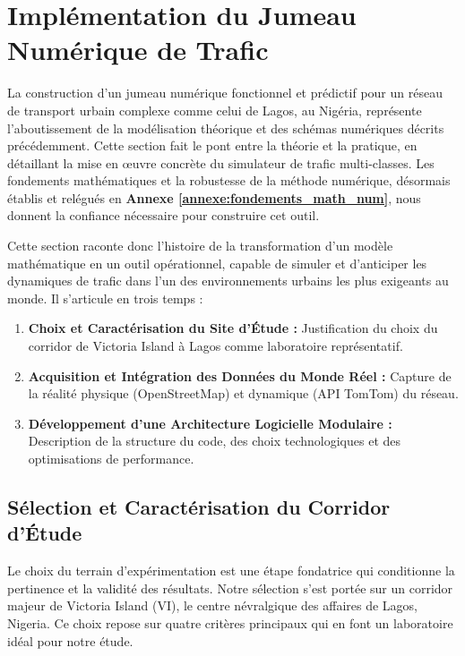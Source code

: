 \section{Implémentation du Jumeau Numérique de Trafic}
\label{ch:implementation_jumeau}

La construction d'un jumeau numérique fonctionnel et prédictif pour un réseau de transport urbain complexe comme celui de Lagos, au Nigéria, représente l'aboutissement de la modélisation théorique et des schémas numériques décrits précédemment. Cette section fait le pont entre la théorie et la pratique, en détaillant la mise en œuvre concrète du simulateur de trafic multi-classes. Les fondements mathématiques et la robustesse de la méthode numérique, désormais établis et relégués en \textbf{Annexe \ref{annexe:fondements_math_num}}, nous donnent la confiance nécessaire pour construire cet outil.

Cette section raconte donc l'histoire de la transformation d'un modèle mathématique en un outil opérationnel, capable de simuler et d'anticiper les dynamiques de trafic dans l'un des environnements urbains les plus exigeants au monde. Il s'articule en trois temps :
\begin{enumerate}
       \item \textbf{Choix et Caractérisation du Site d'Étude :} Justification du choix du corridor de Victoria Island à Lagos comme laboratoire représentatif.
       \item \textbf{Acquisition et Intégration des Données du Monde Réel :} Capture de la réalité physique (OpenStreetMap) et dynamique (API TomTom) du réseau.
       \item \textbf{Développement d'une Architecture Logicielle Modulaire :} Description de la structure du code, des choix technologiques et des optimisations de performance.
\end{enumerate}

\subsection{Sélection et Caractérisation du Corridor d'Étude}
\label{sec:selection_corridor}

Le choix du terrain d'expérimentation est une étape fondatrice qui conditionne la pertinence et la validité des résultats. Notre sélection s'est portée sur un corridor majeur de Victoria Island (VI), le centre névralgique des affaires de Lagos, Nigeria. Ce choix repose sur quatre critères principaux qui en font un laboratoire idéal pour notre étude.

